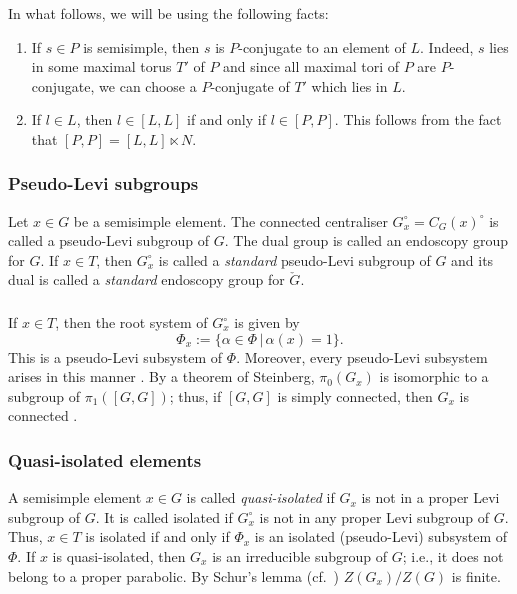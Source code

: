 \documentclass[12pt]{amsart}
\theoremstyle{plain}
\theoremstyle{definition}
\theoremstyle{remark}
\begin{document}
\subsubsection{} In what follows, we will be using the following facts: 
\begin{enumerate} 
\item 
If $s\in P$ is semisimple, then $s$ is $P$-conjugate to an element of $L$. Indeed, $s$ lies in some maximal torus $T'$ of $P$ and since all maximal tori of $P$ are $P$-conjugate, we can choose a $P$-conjugate of $T'$ which lies in $L$. 

\item If $l\in L$, then $l\in [L,L]$ if and only if $l\in [P,P]$. This follows from the fact that $[P,P]=[L,L]\ltimes N$. 
\end{enumerate} 

 
 

\subsubsection{Pseudo-Levi subgroups}  Let $x\in G$ be a semisimple element. The connected centraliser $G_x^\circ=C_G(x)^\circ$ is called a pseudo-Levi subgroup of $G$.  The dual group is called an endoscopy group for $G$.  If $x\in T$, then $G_x^\circ$ is called a \emph{standard} pseudo-Levi subgroup of $G$ and its dual is called a \emph{standard} endoscopy group for $\check{G}$. 

\subsubsection{} If $x\in T$, then the root system of $G_x^\circ$ is given by 
\[
{\Phi}_x:=\{{\alpha} \in {\Phi} \, |\, {\alpha}(x)=1\}.
\]
This is a pseudo-Levi subsystem of $\Phi$. Moreover, every pseudo-Levi subsystem arises in this manner \cite{Deriziotis}. By a theorem of Steinberg, $\pi_0(G_x)$ is isomorphic to a subgroup of $\pi_1([G,G])$; thus, if $[G,G]$ is simply connected, then $G_x$ is connected \cite[\S 2]{Steinberg75}. 

 

\subsubsection{Quasi-isolated elements} \label{s:isolated} A semisimple element $x\in G$ is called \emph{quasi-isolated} if $G_x$ is not in a proper Levi subgroup of $G$.  It is called isolated if $G_x^\circ$ is not in any proper Levi subgroup of $G$. Thus, $x\in T$ is isolated if and only if $\Phi_x$ is an isolated (pseudo-Levi) subsystem of $\Phi$. If $x$ is quasi-isolated, then $G_x$ is an irreducible subgroup of $G$; i.e., it does not belong to a proper parabolic. By Schur's lemma (cf.\ \cite[Proposition 15]{Sikora}) $Z(G_x)/Z(G)$ is finite.
 
\end{document}
